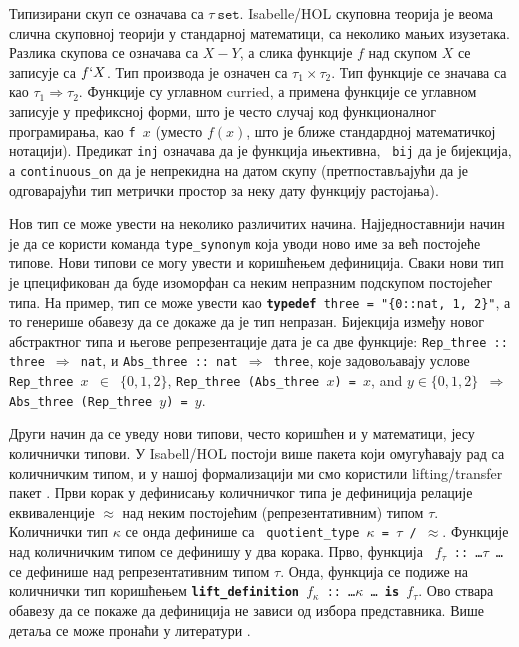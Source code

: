 Типизирани скуп се означава са $\tau\ \mathtt{set}$. Isabelle/HOL
скуповна теорија је веома слична скуповној теорији у стандарној
математици, са неколико мањих изузетака. Разлика скупова се означава
са $X - Y$, а слика функције $f$ над скупом $X$ се записује са $f `
X$. Тип производа је означен са $\tau_1 \times \tau_2$. Тип функције
се значава са као $\tau_1 \Rightarrow \tau_2$. Функције су углавном
curried, а примена функције се углавном записује у префиксној форми,
што је често случај код функционалног програмирања, као {\tt f $x$}
(уместо $f(x)$, што је ближе стандардној математичкој
нотацији). Предикат {\tt inj} означава да је функција ињективна, {\tt
  bij} да је бијекција, а {\tt continuous\_on} да је непрекидна на
датом скупу (претпостављајући да је одговарајући тип метрички простор
за неку дату функцију растојања).

Нов тип се може увести на неколико различитих начина. Најједноставнији
начин је да се користи команда {\tt type\_synonym} која уводи ново име
за већ постојеће типове. Нови типови се могу увести и коришћењем
дефиниција. Сваки нови тип је цпецификован да буде изоморфан са неким
непразним подскупом постојећег типа. На пример, тип се може увести као
{\tt {\bf typedef} three = "\{0::nat, 1, 2\}"}, а то генерише обавезу
да се докаже да је тип непразан. Бијекција између новог абстрактног
типа и његове репрезентације дата је са две функције: {\tt Rep\_three
  :: three $\Rightarrow$ nat}, и {\tt Abs\_three :: nat $\Rightarrow$
  three}, које задовољавају услове {\tt Rep\_three $x$ $\in$ $\{0, 1,
  2\}$}, {\tt Rep\_three (Abs\_three $x$) = $x$}, and {\tt $y \in \{0,
  1, 2\}$ $\Longrightarrow$ Abs\_three (Rep\_three $y$) = $y$}.

Други начин да се уведу нови типови, често коришћен и у математици,
јесу количнички типови. У Isabell/HOL постоји више пакета који
омугућавају рад са количничким типом, и у нашој формализацији ми смо
користили lifting/transfer пакет \cite{lifting-transfer}. Први корак у
дефинисању количничког типа је дефиниција релације еквиваленције
$\approx$ над неким постојећим (репрезентативним) типом
$\tau$. Количнички тип $\kappa$ се онда дефинише са {\tt
  quotient\_type $\kappa$ = $\tau$ / $\approx$}. Функције над
количничким типом се дефинишу у два корака. Прво, функција {\tt
  $f_{\tau}$ :: \ldots $\tau$ \ldots} се дефинише над репрезентативним
типом $\tau$. Онда, функција се подиже на количнички тип коришћењем
{\tt {\bf lift\_definition} $f_{\kappa}$ :: \ldots $\kappa$ \ldots
  {\bf is} $f_{\tau}$}. Ово ствара обавезу да се покаже да дефиниција
не зависи од избора представника. Више детаља се може пронаћи у
литератури \cite{isabelle-quotient,lifting-transfer}.

